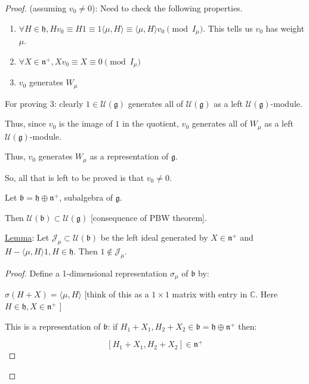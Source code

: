 \documentclass{article}
\theoremstyle{definition}
\begin{document}
\begin{proof}
    (assuming \(v_0\neq 0\)): Need to check the following properties.

    \begin{enumerate}
        \item \(\forall H\in \mathfrak{h}, Hv_0 \equiv H1 \equiv 1 \langle \mu,H \rangle \equiv \langle \mu,H \rangle v_0  \pmod{I_\mu}\). This tells us \(v_0\) has weight \(\mu\).
        \item \(\forall X\in \mathfrak{n}^+, Xv_0 \equiv X \equiv 0 \pmod{I_\mu}\)
        \item \(v_0\) generates \(W_\mu\)    
    \end{enumerate}

    For proving 3: clearly \(1\in \mathcal{U}(\mathfrak{g})\) generates all of \(\mathcal{U}(\mathfrak{g})\) as a left \(\mathcal{U}(\mathfrak{g})\)-module.
    
    Thus, since \(v_0\) is the image of \(1\) in the quotient, \(v_0\) generates all of \(W_\mu\) as a left \(\mathcal{U}(\mathfrak{g})\)-module.
    
    Thus, \(v_0\) generates \(W_\mu\) as a representation of \(\mathfrak{g}\).  

    So, all that is left to be proved is that \(v_0 \neq 0\).

    Let \(\mathfrak{b} = \mathfrak{h} \oplus \mathfrak{n} ^+\), subalgebra of \(\mathfrak{g}\).
    
    Then \(\mathcal{U}(\mathfrak{b}) \subset \mathcal{U}(\mathfrak{g})\) [consequence of PBW theorem].
    
    \underline{Lemma}: Let \(\mathcal{J}_\mu \subset \mathcal{U}(\mathfrak{b})\) be the left ideal generated by \(X\in \mathfrak{n}^+\) and \(H - \langle \mu , H \rangle 1, H\in \mathfrak{h} \). Then \(1 \notin \mathcal{J}_\mu\).
    
    \begin{proof}
        Define a 1-dimensional representation \(\sigma_\mu\) of \(\mathfrak{b}\) by:
        
        \(\sigma(H+X) = \langle \mu , H \rangle \) [think of this as a \(1\times 1\) matrix with entry in \(\mathbb{C}\). Here \(H\in \mathfrak{h}, X\in \mathfrak{n}^+\) ]

        This is a representation of \(\mathfrak{b}\): if \(H_1 + X_1, H_2 + X_2\in \mathfrak{b} = \mathfrak{h} \oplus \mathfrak{n} ^+\) then:
        
        \[
            [H_1 + X_1, H_2 + X_2] \in \mathfrak{n}^+
        \]


\end{proof}
\end{proof}
\end{document}
